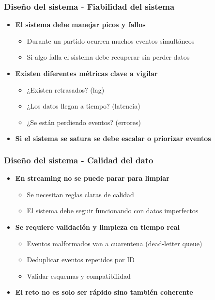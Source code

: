 \documentclass[aspectratio=169]{beamer}
\begin{document}
\begin{frame}
\frametitle{Diseño del sistema - Fiabilidad del sistema}
\begin{itemize}
  \item \textbf{El sistema debe manejar picos y fallos}
  \begin{itemize}
    \item Durante un partido ocurren muchos eventos simultáneos
    \item Si algo falla el sistema debe recuperar sin perder datos
  \end{itemize}

  \vspace{1em}

  \item \textbf{Existen diferentes métricas clave a vigilar}
  \begin{itemize}
    \item ¿Existen retrasados? (lag)
    \item ¿Los datos llegan a tiempo? (latencia)
    \item ¿Se están perdiendo eventos? (errores)
  \end{itemize}

  \vspace{1em}

  \item \textbf{Si el sistema se satura se debe escalar o priorizar eventos}
\end{itemize}
\end{frame}

\begin{frame}
\frametitle{Diseño del sistema - Calidad del dato}
\begin{itemize}
  \item \textbf{En streaming no se puede parar para limpiar}
  \begin{itemize}
    \item Se necesitan reglas claras de calidad
    \item El sistema debe seguir funcionando con datos imperfectos
  \end{itemize}

  \vspace{1em}

  \item \textbf{Se requiere validación y limpieza en tiempo real}
  \begin{itemize}
    \item Eventos malformados van a cuarentena (dead-letter queue)
    \item Deduplicar eventos repetidos por ID
    \item Validar esquemas y compatibilidad
  \end{itemize}

  \vspace{1em}

  \item \textbf{El reto no es solo ser rápido sino también coherente}
\end{itemize}
\end{frame}
\end{document}
